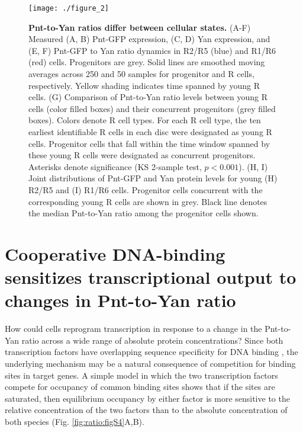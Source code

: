 \begin{figure}[h!]
\centering
\vspace{0pt}
\texttt{[image: ./figure\_2]}
\caption[Pnt-to-Yan ratios differ between cellular states.]{\textbf{Pnt-to-Yan ratios differ between cellular states.} (A-F) Measured (A, B) Pnt-GFP expression, (C, D) Yan expression, and (E, F) Pnt-GFP to Yan ratio dynamics in R2/R5 (blue) and R1/R6 (red) cells. Progenitors are grey. Solid lines are smoothed moving averages across 250 and 50 samples for progenitor and R cells, respectively. Yellow shading indicates time spanned by young R cells. (G) Comparison of Pnt-to-Yan ratio levels between young R cells (color filled boxes) and their concurrent progenitors (grey filled boxes). Colors denote R cell types. For each R cell type, the ten earliest identifiable R cells in each disc were designated as young R cells. Progenitor cells that fall within the time window spanned by these young R cells were designated as concurrent progenitors. Asterisks denote significance (KS 2-sample test, $p<0.001$). (H, I) Joint distributions of Pnt-GFP and Yan protein levels for young (H) R2/R5 and (I) R1/R6 cells. Progenitor cells concurrent with the corresponding young R cells are shown in grey. Black line denotes the median Pnt-to-Yan ratio among the progenitor cells shown.}
\label{fig:ratio:fig2}
\end{figure}

\section{Cooperative DNA-binding sensitizes transcriptional output to changes in Pnt-to-Yan ratio }

How could cells reprogram transcription in response to a change in the Pnt-to-Yan ratio across a wide range of absolute protein concentrations? Since both transcription factors have overlapping sequence specificity for DNA binding \cite{Xu2000,Halfon2000,Flores2000,Wei2010,Webber2013,Webber2013a,Nitta2015}, the underlying mechanism may be a natural consequence of competition for binding sites in target genes. A simple model in which the two transcription factors compete for occupancy of common binding sites shows that if the sites are saturated, then equilibrium occupancy by either factor is more sensitive to the relative concentration of the two factors than to the absolute concentration of both species (Fig. \ref{fig:ratio:figS4}A,B).

